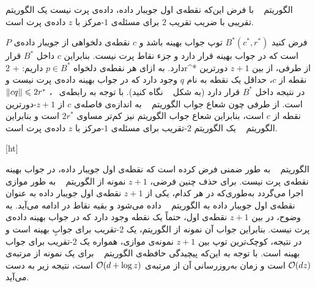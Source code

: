 الگوریتم  ~  با فرض این‌که نقطه‌ی اول جویبار داده، داده‌ی پرت نیست یک الگوریتم تقریبی با ضریب تقریب $2$ برای مسئله‌ی $1$-مرکز با $z$ داده‌ی پرت است.

فرض کنید $B^*(c^*, r^*)$ توپ جواب بهینه باشد و $c$ نقطه‌ی دلخواهی از جویبار داده‌ی $P$ است که در جواب بهینه قرار دارد و جزء نقاط پرت نیست.
بنابراین $c$ داخل $B^*$ قرار دارد. به ازای هر نقطه‌ی دلخواه $p \in B^*$ داریم:
 \leq {} +  \leq 2r^*
از طرفی، از بین $z+1$ دورترین نقطه از $c$، حداقل یک نقطه به نام $q$ وجود دارد که در جواب بهینه داده‌ی پرت نیست و در نتیجه داخل $B^*$ قرار دارد (به شکل ~ نگاه کنید).
با توجه به رابطه‌ی ~، $\|{cq}\| \leqslant 2r^*$ است.
از طرفی چون شعاع جواب الگوریتم ~ به اندازه‌ی فاصله‌ی $c$ از $z+1$-دورترین نقطه از $c$ است، بنابراین شعاع جواب الگوریتم نیز کم‌تر مساوی $2r^*$ است و بنابراین الگوریتم ~ یک الگوریتم $2$-تقریب برای مسئله‌ی $1$-مرکز با $z$ داده‌ی پرت است.




[ht]

الگوریتم ~ به طور ضمنی فرض کرده است که نقطه‌ی اول جویبار داده، در جواب بهینه نقطه‌ی پرت نیست.
برای حذف چنین فرضی، $z+1$ نمونه از الگوریتم ~ به طور موازی اجرا می‌گردد به‌طوری‌که در هر کدام، یکی از $z+1$ نقطه‌ی اول جویبار داده به عنوان نقطه‌ی اول جویبار داده به الگوریتم ~ داده می‌شود و بقیه نقاط در ادامه می‌آید.
به وضوح، در بین $z+1$ نقطه‌ی اول، حتماً یک نقطه وجود دارد که در جواب بهینه داده‌ی پرت نیست.
بنابراین جواب آن نمونه از الگوریتم، یک $2$-تقریب برای جوابِ بهینه است و در نتیجه، کوچک‌ترین توپ بین $z+1$ نمونه‌ی موازی، همواره یک $2$-تقریب برای جواب بهینه است.
با توجه به این‌که پیچیدگی حافظه‌ی الگوریتم ~ برای یک نمونه از مرتبه‌ی $\mathcal{O}(dz)$ است و زمان به‌روزرسانی آن از مرتبه‌ی $\mathcal{O}(d + \log{z})$ است، نتیجه زیر به دست می‌آید. 

